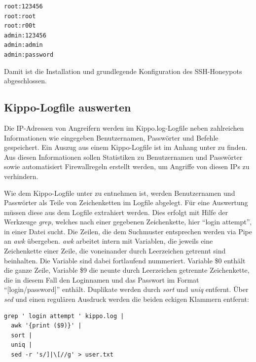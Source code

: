 \begin{lstlisting}[style=customc]
root:123456
root:root
root:r00t
admin:123456
admin:admin
admin:password
\end{lstlisting}

Damit ist die Installation und grundlegende Konfiguration des SSH-Honeypots abgeschlossen.

\subsection{Kippo-Logfile auswerten}
\label{subsec:Kippo-Logfile auswerten}


Die IP-Adressen von Angreifern werden im Kippo.log-Logfile neben zahlreichen Informationen wie eingegeben Benutzernamen, Passwörter und Befehle gespeichert. Ein Auszug aus einem Kippo-Logfile ist im Anhang unter \textit{} zu finden. Aus diesen Informationen sollen Statistiken zu Benutzernamen und Passwörter sowie automatisiert Firewallregeln erstellt werden, um Angriffe von diesen IPs zu verhindern.

Wie dem Kippo-Logfile unter \textit{} zu entnehmen ist, werden Benutzernamen und Passwörter als Teile von Zeichenketten im Logfile abgelegt. Für eine Auswertung müssen diese aus dem Logfile extrahiert werden. Dies erfolgt mit Hilfe der Werkzeuge \textit{grep}, welches nach  einer gegebenen Zeichenkette, hier "`login attempt"', in einer Datei sucht. Die Zeilen, die dem Suchmuster entsprechen werden via Pipe an \textit{awk} übergeben. \textit{awk} arbeitet intern mit Variablen, die jeweils eine Zeichenkette einer Zeile, die voneinander durch Leerzeichen getrennt sind beinhalten. Die Variable sind dabei fortlaufend nummeriert. Variable \$0 enthält die ganze Zeile, Variable \$9 die neunte durch Leerzeichen getrennte Zeichenkette, die in diesem Fall den Loginnamen und das Passwort im Format "`[login/password]"' enthält. Duplikate werden durch \textit{sort} und \textit{uniq} entfernt. Über \textit{sed} und einen regulären Ausdruck werden die beiden eckigen Klammern entfernt:



\begin{lstlisting}[style=customc]
grep ' login attempt ' kippo.log |
  awk '{print ($9)}' |
  sort |
  uniq |
  sed -r 's/]|\[//g' > user.txt

\end{lstlisting}

